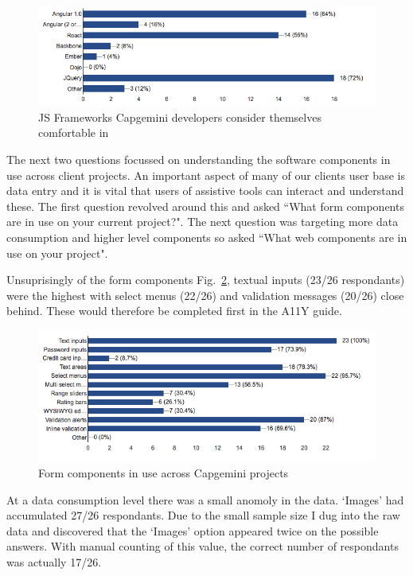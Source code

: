 \begin{figure}[H]
\centering
\centering
\includegraphics[width=\textwidth]{figures/questions/frameworks_competent_in}
\captionsetup{justification=centering}
\caption{JS Frameworks Capgemini developers consider themselves comfortable in
\label{fig:competent_in}}
\end{figure}

The next two questions focussed on understanding the software components in
use across client projects. An important aspect of many of our clients user base
is data entry and it is vital that users of assistive tools can interact and
understand these. The first question revolved around this and asked ``What
form components are in use on your current project?". The next question was
targeting more data consumption and higher level components so asked ``What
web components are in use on your project".

Unsuprisingly of the form components Fig.~\ref{fig:form_components}, textual
inputs (23/26 respondants) were the highest with select menus (22/26) and
validation messages (20/26) close behind. These would therefore be completed
first in the A11Y guide.

\begin{figure}[H]
\centering
\centering
\includegraphics[width=\textwidth]{figures/questions/form_items}
\captionsetup{justification=centering}
\caption{Form components in use across Capgemini projects
\label{fig:form_components}}
\end{figure}

At a data consumption level there was a small anomoly in the data. `Images'
had accumulated 27/26 respondants. Due to the small sample size I dug into the
raw data and discovered that the `Images' option appeared twice on the
possible answers. With manual counting of this value, the correct number
of respondants was actually 17/26.

